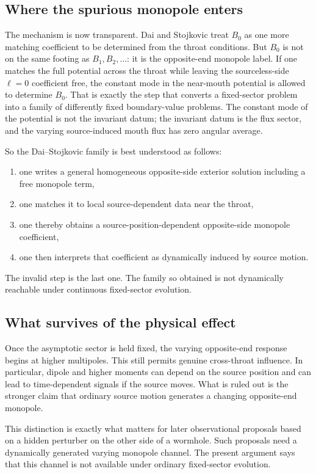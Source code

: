 \documentclass[aps,prd,onecolumn,nofootinbib,superscriptaddress]{revtex4-2}
\begin{document}
\subsection{Where the spurious monopole enters}

The mechanism is now transparent. Dai and Stojkovic treat $B_0$ as one more matching coefficient to be determined from the throat conditions. But $B_0$ is not on the same footing as $B_1,B_2,\dots$: it is the opposite-end monopole label. If one matches the full potential across the throat while leaving the sourceless-side $\ell=0$ coefficient free, the constant mode in the near-mouth potential is allowed to determine $B_0$. That is exactly the step that converts a fixed-sector problem into a family of differently fixed boundary-value problems. The constant mode of the potential is not the invariant datum; the invariant datum is the flux sector, and the varying source-induced mouth flux has zero angular average.

So the Dai--Stojkovic family is best understood as follows:
\begin{enumerate}
    \item one writes a general homogeneous opposite-side exterior solution including a free monopole term,
    \item one matches it to local source-dependent data near the throat,
    \item one thereby obtains a source-position-dependent opposite-side monopole coefficient,
    \item one then interprets that coefficient as dynamically induced by source motion.
\end{enumerate}
The invalid step is the last one. The family so obtained is not dynamically reachable under continuous fixed-sector evolution.

\subsection{What survives of the physical effect}

Once the asymptotic sector is held fixed, the varying opposite-end response begins at higher multipoles. This still permits genuine cross-throat influence. In particular, dipole and higher moments can depend on the source position and can lead to time-dependent signals if the source moves. What is ruled out is the stronger claim that ordinary source motion generates a changing opposite-end monopole.

This distinction is exactly what matters for later observational proposals based on a hidden perturber on the other side of a wormhole.\cite{SimonettiEtAl2021SensitiveSearches,BaoHouZhang2023GWScattering} Such proposals need a dynamically generated varying monopole channel. The present argument says that this channel is not available under ordinary fixed-sector evolution.
\end{document}

